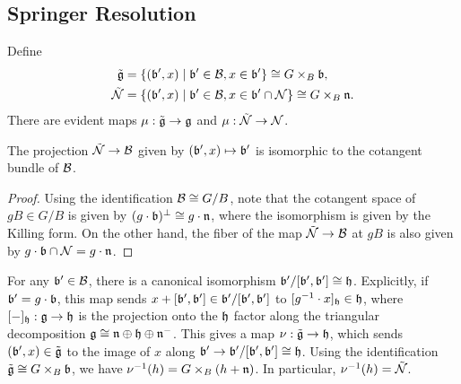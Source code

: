 \fi

\subsection{Springer Resolution}

Define
\begin{align*}
    \tilde{\mathfrak{g}} &= \{ (\mathfrak{b}', x) \mid \mathfrak{b}' \in \mathcal{B}, x \in \mathfrak{b}' \} \cong G \times_B \mathfrak{b}, \\
    \tilde{\mathcal{N}} &= \{ (\mathfrak{b}', x) \mid \mathfrak{b}' \in \mathcal{B}, x \in \mathfrak{b}' \cap \mathcal{N} \} \cong G \times_B \mathfrak{n}.
\end{align*}
There are evident maps $\mu : \tilde{\mathfrak{g}} \to \mathfrak{g}$ and $\mu : \tilde{\mathcal{N}} \to \mathcal{N}$.

\begin{lemma}[lem:]{}
    The projection $\tilde{\mathcal{N}} \to \mathcal{B}$ given by $(\mathfrak{b}', x) \mapsto \mathfrak{b}'$ is isomorphic to the cotangent bundle of $\mathcal{B}$. 
    \begin{proof}
        Using the identification $\mathcal{B} \cong G/B$, note that the cotangent space of $gB \in G/B$ is given by $(g \cdot \mathfrak{b})^\perp \cong g \cdot \mathfrak{n}$, where the isomorphism is given by the Killing form. On the other hand, the fiber of the map $\tilde{\mathcal{N}} \to \mathcal{B}$ at $gB$ is also given by $g \cdot \mathfrak{b} \cap \mathcal{N} = g \cdot \mathfrak{n}$.
    \end{proof}
\end{lemma}
For any $\mathfrak{b}' \in \mathcal{B}$, there is a canonical isomorphism $\mathfrak{b}'/[\mathfrak{b}', \mathfrak{b}'] \cong \mathfrak{h}$. Explicitly, if $\mathfrak{b}' = g \cdot \mathfrak{b}$, this map sends $x + [\mathfrak{b}', \mathfrak{b}'] \in \mathfrak{b}'/[\mathfrak{b}', \mathfrak{b}']$ to $[g^{-1} \cdot x]_{\mathfrak{h}} \in \mathfrak{h}$, where $[-]_{\mathfrak{h}} : \mathfrak{g} \to \mathfrak{h}$ is the projection onto the $\mathfrak{h}$ factor along the triangular decomposition $\mathfrak{g} \cong \mathfrak{n} \oplus \mathfrak{h} \oplus \mathfrak{n}^-$. This gives a map $\nu : \tilde{\mathfrak{g}} \to \mathfrak{h}$, which sends $(\mathfrak{b}', x) \in \tilde{\mathfrak{g}}$ to the image of $x$ along $\mathfrak{b}' \to \mathfrak{b}'/[\mathfrak{b}', \mathfrak{b}'] \cong \mathfrak{h}$. Using the identification $\tilde{\mathfrak{g}} \cong G \times_B \mathfrak{b}$, we have $\nu^{-1}(h) = G \times_B (h + \mathfrak{n})$. In particular, $\nu^{-1}(h) = \tilde{\mathcal{N}}$.

